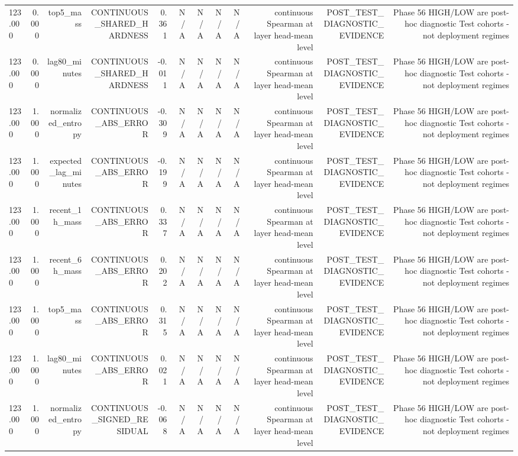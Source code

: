 \begin{table}[h!]
\begin{tabular}{lrrrrrrrrrrr}
123.000 & 0.000 & top5\_mass & CONTINUOUS\_SHARED\_HARDNESS & 0.361 & N/A & N/A & N/A & N/A & continuous Spearman at layer head-mean level & POST\_TEST\_DIAGNOSTIC\_EVIDENCE & Phase 56 HIGH/LOW are post-hoc diagnostic Test cohorts - not deployment regimes \\
123.000 & 0.000 & lag80\_minutes & CONTINUOUS\_SHARED\_HARDNESS & -0.011 & N/A & N/A & N/A & N/A & continuous Spearman at layer head-mean level & POST\_TEST\_DIAGNOSTIC\_EVIDENCE & Phase 56 HIGH/LOW are post-hoc diagnostic Test cohorts - not deployment regimes \\
123.000 & 1.000 & normalized\_entropy & CONTINUOUS\_ABS\_ERROR & -0.309 & N/A & N/A & N/A & N/A & continuous Spearman at layer head-mean level & POST\_TEST\_DIAGNOSTIC\_EVIDENCE & Phase 56 HIGH/LOW are post-hoc diagnostic Test cohorts - not deployment regimes \\
123.000 & 1.000 & expected\_lag\_minutes & CONTINUOUS\_ABS\_ERROR & -0.199 & N/A & N/A & N/A & N/A & continuous Spearman at layer head-mean level & POST\_TEST\_DIAGNOSTIC\_EVIDENCE & Phase 56 HIGH/LOW are post-hoc diagnostic Test cohorts - not deployment regimes \\
123.000 & 1.000 & recent\_1h\_mass & CONTINUOUS\_ABS\_ERROR & 0.337 & N/A & N/A & N/A & N/A & continuous Spearman at layer head-mean level & POST\_TEST\_DIAGNOSTIC\_EVIDENCE & Phase 56 HIGH/LOW are post-hoc diagnostic Test cohorts - not deployment regimes \\
123.000 & 1.000 & recent\_6h\_mass & CONTINUOUS\_ABS\_ERROR & 0.202 & N/A & N/A & N/A & N/A & continuous Spearman at layer head-mean level & POST\_TEST\_DIAGNOSTIC\_EVIDENCE & Phase 56 HIGH/LOW are post-hoc diagnostic Test cohorts - not deployment regimes \\
123.000 & 1.000 & top5\_mass & CONTINUOUS\_ABS\_ERROR & 0.315 & N/A & N/A & N/A & N/A & continuous Spearman at layer head-mean level & POST\_TEST\_DIAGNOSTIC\_EVIDENCE & Phase 56 HIGH/LOW are post-hoc diagnostic Test cohorts - not deployment regimes \\
123.000 & 1.000 & lag80\_minutes & CONTINUOUS\_ABS\_ERROR & 0.021 & N/A & N/A & N/A & N/A & continuous Spearman at layer head-mean level & POST\_TEST\_DIAGNOSTIC\_EVIDENCE & Phase 56 HIGH/LOW are post-hoc diagnostic Test cohorts - not deployment regimes \\
123.000 & 1.000 & normalized\_entropy & CONTINUOUS\_SIGNED\_RESIDUAL & -0.068 & N/A & N/A & N/A & N/A & continuous Spearman at layer head-mean level & POST\_TEST\_DIAGNOSTIC\_EVIDENCE & Phase 56 HIGH/LOW are post-hoc diagnostic Test cohorts - not deployment regimes \\

\end{tabular}
\end{table}

